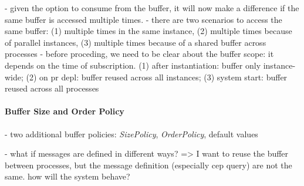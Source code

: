 - given the option to consume from the buffer, it will now make a difference if the same buffer is accessed multiple times.
- there are two scenarios to access the same buffer: (1) multiple times in the same instance, (2) multiple times because of parallel instances, (3) multiple times because of a shared buffer across processes
- before proceding, we need to be clear about the buffer scope: it depends on the time of subscription. (1) after instantiation: buffer only instance-wide; (2) on pr depl: buffer reused across all instances; (3) system start: buffer reused across all processes

\paragraph{Buffer Size and Order Policy\newline}

- two additional buffer policies: \textit{SizePolicy}, \textit{OrderPolicy}, default values

- what if messages are defined in different ways? => I want to reuse the buffer between processes, but the message definition (especially cep query) are not the same. how will the system behave?
